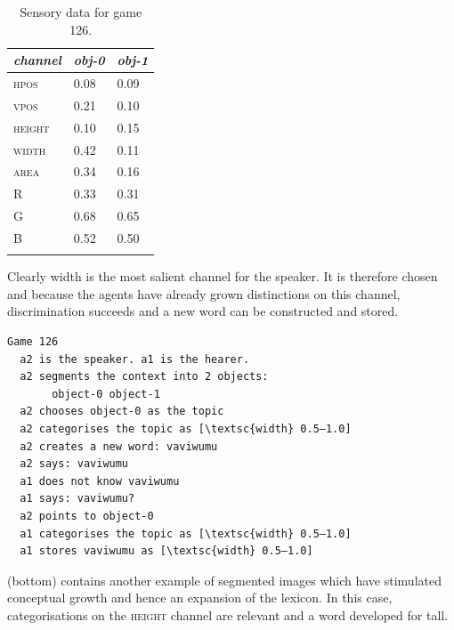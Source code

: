 \begin{table}
\begin{center}
\begin{tabular}{lll}
\lsptoprule
{\itshape channel}& {\itshape obj-0} & {\itshape obj-1}\\ \midrule
\textsc{hpos} & 0.08 & 0.09\\ 
\textsc{vpos} & 0.21 & 0.10\\ 
\textsc{height} & 0.10 & 0.15\\ 
\textsc{width} & 0.42 & 0.11\\ 
\textsc{area} & 0.34 & 0.16\\ 
R & 0.33 & 0.31\\ 
G & 0.68 & 0.65\\ 
B & 0.52 & 0.50\\ 
\lspbottomrule
\end{tabular}
\caption{\label{tab:game126}Sensory data for game 126.}
\end{center}
\end{table}
Clearly width is the most salient channel for the speaker. 
It is therefore chosen and because the 
agents have already grown distinctions on this channel, 
discrimination succeeds and a new word can be
constructed and stored. 
\begin{verbatim}
Game 126 
  a2 is the speaker. a1 is the hearer. 
  a2 segments the context into 2 objects: 
       object-0 object-1
  a2 chooses object-0 as the topic 
  a2 categorises the topic as [\textsc{width} 0.5–1.0]
  a2 creates a new word: vaviwumu
  a2 says: vaviwumu
  a1 does not know vaviwumu
  a1 says: vaviwumu?
  a2 points to object-0
  a1 categorises the topic as [\textsc{width} 0.5–1.0]
  a1 stores vaviwumu as [\textsc{width} 0.5–1.0]
\end{verbatim}
 (bottom) contains another example
of segmented images which have stimulated conceptual
growth and hence an expansion of the lexicon. 
In this case, categorisations on the \textsc{height} channel are
relevant and a word developed for tall.

